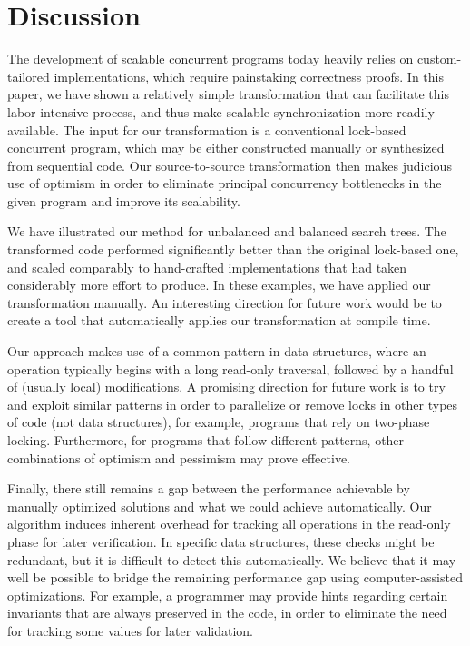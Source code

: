 \section{Discussion}\label{sec:discussion}

The development of scalable concurrent programs today
heavily relies on custom-tailored implementations, which require painstaking correctness proofs.
In this paper, we have shown a relatively simple  transformation that can facilitate this labor-intensive process, and
thus make scalable synchronization more readily available.
The input for our transformation is a conventional lock-based concurrent program, which may be either constructed manually or
synthesized from sequential code. Our source-to-source transformation then makes judicious use of optimism in order to
eliminate principal concurrency bottlenecks in the given program and improve its scalability. 

We have illustrated our method for unbalanced and balanced search trees.
The transformed code performed significantly better than the original
lock-based one, and scaled comparably  to hand-crafted
implementations that had taken considerably more effort to produce.
In these examples, we have  applied our transformation manually. An interesting direction for future work would be to create a tool that automatically applies our transformation at compile time.

Our approach makes use of a common pattern in data structures, where an operation typically begins with a long read-only traversal, followed by a handful of (usually local) modifications.
A promising direction for future work  is to try and
exploit similar patterns in order to parallelize or remove locks in other types of code (not data structures), for example, programs that rely on two-phase locking.
Furthermore, for programs that follow different patterns, other combinations of optimism and pessimism may prove effective.

Finally, there still remains a gap between the performance achievable by manually optimized solutions and what we could achieve automatically. Our algorithm induces inherent overhead for tracking all operations in the read-only phase for later verification.
In specific data structures, these checks might be redundant, but it is difficult  to detect this automatically. We believe that
it may well be possible to bridge the remaining performance gap using computer-assisted optimizations. For example, a programmer may provide hints regarding certain 
invariants that are always preserved in the code, in order to eliminate the need for tracking some values for later
validation. 
